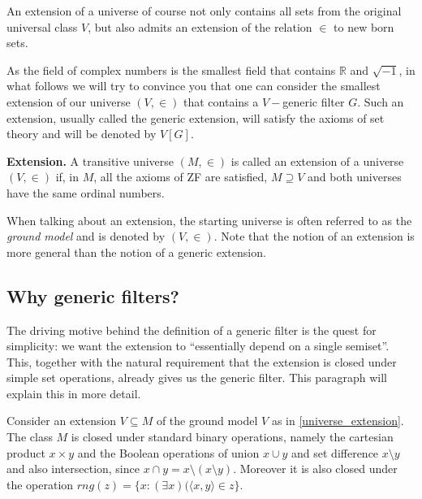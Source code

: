 An extension of a universe of course not only contains all sets from the original universal
class $V$, but also admits an extension of the relation $\in$ to new born sets.

As the field of complex numbers is the smallest field that contains
$\mathbb R$ and $\sqrt{-1}$, in what follows we will try to
convince you that one can consider the smallest extension of
our universe $(V,\in)$ that contains a $V-$generic filter $G$. Such an extension,
usually called the generic extension,
will satisfy the axioms of set theory and will be denoted by $V[G]$.

\begin{definition}\label{universe_extension}{\bf Extension.}
A transitive universe $(M,\in)$ is called an extension of
a universe $(V,\in)$ if, in $M$, all the axioms of ZF are satisfied,
$M \supseteq V$ and both universes have the same ordinal numbers.
\end{definition}

When talking about an extension, the starting universe
is often referred to as the \emph{ground model} and is denoted by $(V,\in)$. Note
that the notion of an extension is more general than the notion of a generic
extension.


\smallskip

\subsection{Why generic filters?}
The driving motive behind the definition of a generic filter is the
quest for simplicity: we want the extension to ``essentially depend
on a single semiset''. This, together with the natural requirement
that the extension is closed under simple set operations, already
gives us the generic filter. This paragraph will explain this in
more detail.

Consider an extension $V\subseteq M$ of the ground model $V$ as in \ref{universe_extension}.
The class $M$ is closed under standard binary operations, namely the
cartesian product $x\times y$ and the Boolean operations of union $x\cup y$
and set difference $x\setminus y$ and also intersection, since $x\cap y=x\setminus(x\setminus y)$.
Moreover it is also closed under the operation $rng(z)=\{x:(\exists x)(\langle x,y\rangle\in z\}$.

